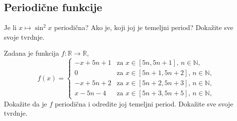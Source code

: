 \subsection*{Periodične funkcije}
\begin{exercise}
Je li $x\mapsto \sin^2{x}$ periodična? Ako je, koji joj je temeljni period? Dokažite sve svoje tvrdnje.
\end{exercise}
\begin{exercise}
Zadana je funkcija $f : \mathbb{R}\to \mathbb{R}$,
$$f(x)=\begin{cases}
-x+5n+1 & \text{za } x\in [5n, 5n+1],\, n\in \mathbb{N},\\
0 & \text{za } x\in [5n+1, 5n+2],\, n\in \mathbb{N},\\
-x+5n+2 & \text{za } x\in [5n+2, 5n+3],\, n\in \mathbb{N},\\
x-5n-4 & \text{za } x\in [5n+3, 5n+5],\, n\in \mathbb{N},
\end{cases}$$
Dokažite da je $f$ periodična i odredite joj temeljni period. Dokažite sve svoje tvrdnje.
\end{exercise}